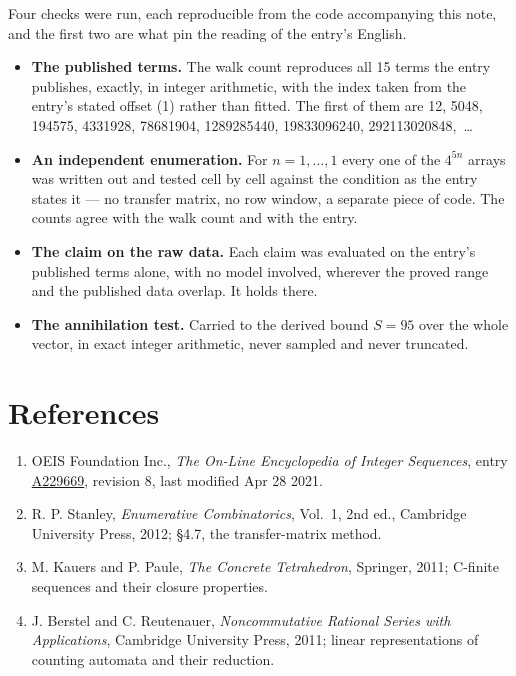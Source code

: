 \documentclass[11pt]{article}
\theoremstyle{definition}
\begin{document}
Four checks were run, each reproducible from the code accompanying this note, and the first two are what pin the reading of the entry's English.

\begin{itemize}

\item {\bfseries The published terms.} The walk count reproduces all 15 terms the entry publishes, exactly, in integer arithmetic, with the index taken from the entry's stated offset (1) rather than fitted. The first of them are 12, 5048, 194575, 4331928, 78681904, 1289285440, 19833096240, 292113020848,~\dots

\item {\bfseries An independent enumeration.} For $n = 1,\dots,1$ every one of the $4^{5n}$ arrays was written out and tested cell by cell against the condition as the entry states it --- no transfer matrix, no row window, a separate piece of code. The counts agree with the walk count and with the entry.

\item {\bfseries The claim on the raw data.} Each claim was evaluated on the entry's published terms alone, with no model involved, wherever the proved range and the published data overlap. It holds there.

\item {\bfseries The annihilation test.} Carried to the derived bound $S = 95$ over the whole vector, in exact integer arithmetic, never sampled and never truncated.

\end{itemize}

\section{References}

\begin{enumerate}

\item OEIS Foundation Inc., \emph{The On-Line Encyclopedia of Integer Sequences}, entry \href{https://oeis.org/A229669}{A229669}, revision 8, last modified Apr 28 2021.

\item R. P. Stanley, \emph{Enumerative Combinatorics}, Vol.~1, 2nd ed., Cambridge University Press, 2012; \S4.7, the transfer-matrix method.

\item M. Kauers and P. Paule, \emph{The Concrete Tetrahedron}, Springer, 2011; C-finite sequences and their closure properties.

\item J. Berstel and C. Reutenauer, \emph{Noncommutative Rational Series with Applications}, Cambridge University Press, 2011; linear representations of counting automata and their reduction.

\end{enumerate}
\end{document}
